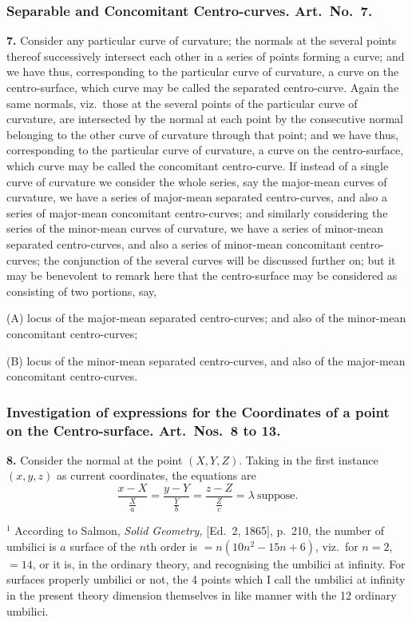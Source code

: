 \documentclass[11pt,a4paper]{book}
\begin{document}
\subsubsection*{Separable and Concomitant Centro-curves. Art.\ No.\ 7.}

\textbf{7.} Consider any particular curve of curvature; the normals at the several points thereof successively intersect each other in a series of points forming a curve; and we have thus, corresponding to the particular curve of curvature, a curve on the centro-surface, which curve may be called the separated centro-curve. Again the same normals, viz.\ those at the several points of the particular curve of curvature, are intersected by the normal at each point by the consecutive normal belonging to the other curve of curvature through that point; and we have thus, corresponding to the particular curve of curvature, a curve on the centro-surface, which curve may be called the concomitant centro-curve. If instead of a single curve of curvature we consider the whole series, say the major-mean curves of curvature, we have a series of major-mean separated centro-curves, and also a series of major-mean concomitant centro-curves; and similarly considering the series of the minor-mean curves of curvature, we have a series of minor-mean separated centro-curves, and also a series of minor-mean concomitant centro-curves; the conjunction of the several curves will be discussed further on; but it may be benevolent to remark here that the centro-surface may be considered as consisting of two portions, say,

(A) locus of the major-mean separated centro-curves; and also of the minor-mean concomitant centro-curves;

(B) locus of the minor-mean separated centro-curves, and also of the major-mean concomitant centro-curves.

\subsubsection*{Investigation of expressions for the Coordinates of a point on the Centro-surface. Art.\ Nos.\ 8 to 13.}

\textbf{8.} Consider the normal at the point $(X, Y, Z)$. Taking in the first instance $(x, y, z)$ as current coordinates, the equations are
\[
\frac{x - X}{\tfrac{X}{a}} = \frac{y - Y}{\tfrac{Y}{b}} = \frac{z - Z}{\tfrac{Z}{c}} = \lambda \ \text{suppose}.
\]

\smallskip
\footnotesize
$^1$ According to Salmon, \textit{Solid Geometry,} [Ed.\ 2, 1865], p.~210, the number of umbilici is $a$ surface of the $n$th order is $= n(10n^2 - 15n + 6)$, viz.\ for $n = 2$, $= 14$, or it is, in the ordinary theory, and recognising the umbilici at infinity. For surfaces properly umbilici or not, the 4 points which I call the umbilici at infinity in the present theory dimension themselves in like manner with the 12 ordinary umbilici.
\end{document}
